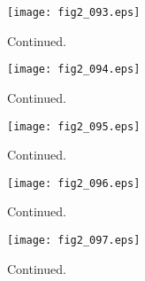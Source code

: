 \documentclass[preprint]{aastex}
\begin{document}
\setcounter{figure}{1}
\begin{figure}[t]
\centering
\texttt{[image: fig2\_093.eps]}
\caption{
Continued. 
}
\label{Fig2}
\end{figure}
\clearpage



\setcounter{figure}{1}
\begin{figure}[t]
\centering
\texttt{[image: fig2\_094.eps]}
\caption{
Continued. 
}
\label{Fig2}
\end{figure}
\clearpage



\setcounter{figure}{1}
\begin{figure}[t]
\centering
\texttt{[image: fig2\_095.eps]}
\caption{
Continued. 
}
\label{Fig2}
\end{figure}
\clearpage



\setcounter{figure}{1}
\begin{figure}[t]
\centering
\texttt{[image: fig2\_096.eps]}
\caption{
Continued. 
}
\label{Fig2}
\end{figure}
\clearpage



\setcounter{figure}{1}
\begin{figure}[t]
\centering
\texttt{[image: fig2\_097.eps]}
\caption{
Continued. 
}
\label{Fig2}
\end{figure}
\clearpage
\end{document}
